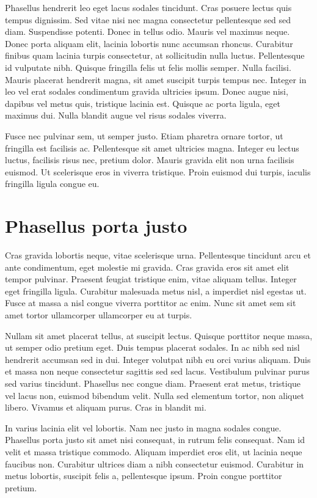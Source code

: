 Phasellus hendrerit leo eget lacus sodales tincidunt. Cras posuere lectus quis tempus dignissim. Sed vitae nisi nec magna consectetur pellentesque sed sed diam. Suspendisse potenti. Donec in tellus odio. Mauris vel maximus neque. Donec porta aliquam elit, lacinia lobortis nunc accumsan rhoncus. Curabitur finibus quam lacinia turpis consectetur, at sollicitudin nulla luctus. Pellentesque id vulputate nibh. Quisque fringilla felis ut felis mollis semper. Nulla facilisi. Mauris placerat hendrerit magna, sit amet suscipit turpis tempus nec. Integer in leo vel erat sodales condimentum gravida ultricies ipsum. Donec augue nisi, dapibus vel metus quis, tristique lacinia est. Quisque ac porta ligula, eget maximus dui. Nulla blandit augue vel risus sodales viverra.

Fusce nec pulvinar sem, ut semper justo. Etiam pharetra ornare tortor, ut fringilla est facilisis ac. Pellentesque sit amet ultricies magna. Integer eu lectus luctus, facilisis risus nec, pretium dolor. Mauris gravida elit non urna facilisis euismod. Ut scelerisque eros in viverra tristique. Proin euismod dui turpis, iaculis fringilla ligula congue eu.

\section{Phasellus porta justo}
Cras gravida lobortis neque, vitae scelerisque urna. Pellentesque tincidunt arcu et ante condimentum, eget molestie mi gravida. Cras gravida eros sit amet elit tempor pulvinar. Praesent feugiat tristique enim, vitae aliquam tellus. Integer eget fringilla ligula. Curabitur malesuada metus nisl, a imperdiet nisl egestas ut. Fusce at massa a nisl congue viverra porttitor ac enim. Nunc sit amet sem sit amet tortor ullamcorper ullamcorper eu at turpis.

Nullam sit amet placerat tellus, at suscipit lectus. Quisque porttitor neque massa, ut semper odio pretium eget. Duis tempus placerat sodales. In ac nibh sed nisl hendrerit accumsan sed in dui. Integer volutpat nibh eu orci varius aliquam. Duis et massa non neque consectetur sagittis sed sed lacus. Vestibulum pulvinar purus sed varius tincidunt. Phasellus nec congue diam. Praesent erat metus, tristique vel lacus non, euismod bibendum velit. Nulla sed elementum tortor, non aliquet libero. Vivamus et aliquam purus. Cras in blandit mi.

In varius lacinia elit vel lobortis. Nam nec justo in magna sodales congue. Phasellus porta justo sit amet nisi consequat, in rutrum felis consequat. Nam id velit et massa tristique commodo. Aliquam imperdiet eros elit, ut lacinia neque faucibus non. Curabitur ultrices diam a nibh consectetur euismod. Curabitur in metus lobortis, suscipit felis a, pellentesque ipsum. Proin congue porttitor pretium.


